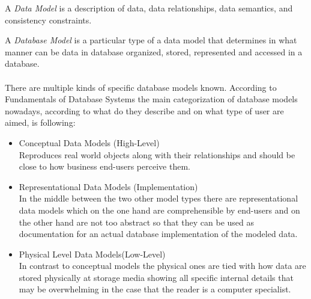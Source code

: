 \par
A \textit{Data Model} is a description of data, data relationships, data semantics, and consistency constraints. \\
\par
A \textit{Database Model} is a particular type of a data model that determines in what manner can be data in database organized, stored, represented and accessed in a database.
\\
\\
There are multiple kinds of specific database models known.
According to Fundamentals of Database Systems \cite{SilberschatzKorthSudarshan10} the main categorization of database models nowadays, according to what do they describe and on what type of user are aimed, is following:
\begin{itemize}
	\item Conceptual Data Models (High-Level) \\
		Reproduces real world objects along with their relationships and should be close to how business end-users perceive them.
	
	\item Representational Data Models (Implementation) \\
		In the middle between the two other model types there are representational data models which on the one hand are comprehensible by end-users and on the other hand are not too abstract so that they can be used as documentation for an actual database implementation of the modeled data.
	
	\item Physical Level Data Models(Low-Level) \\
		 In contrast to conceptual models the physical ones are tied with how data are stored physically at storage media showing all specific internal details that may be overwhelming in the case that the reader is a computer specialist.
\end{itemize}

